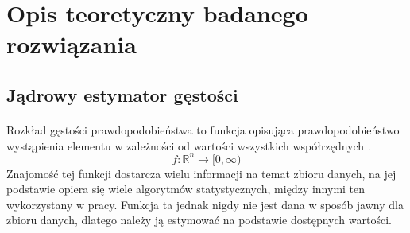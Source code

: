 \documentclass[a4paper,12pt,twoside]{article}
\begin{document}
\newpage
\section{Opis teoretyczny badanego rozwiązania}
\subsection{Jądrowy estymator gęstości}
\paragraph{}
Rozkład gęstości prawdopodobieństwa to funkcja opisująca prawdopodobieństwo wystąpienia elementu w zależności od wartości wszystkich współrzędnych \cite{kde}. 
\begin{equation} f:\mathbb{R}^n\rightarrow [0,\infty )
\end{equation}
Znajomość tej funkcji dostarcza wielu informacji na temat zbioru danych, na jej podstawie opiera się wiele algorytmów statystycznych, między innymi ten wykorzystany w pracy. Funkcja ta jednak nigdy nie jest dana w sposób jawny dla zbioru danych, dlatego należy ją estymować na podstawie dostępnych wartości.
\end{document}
